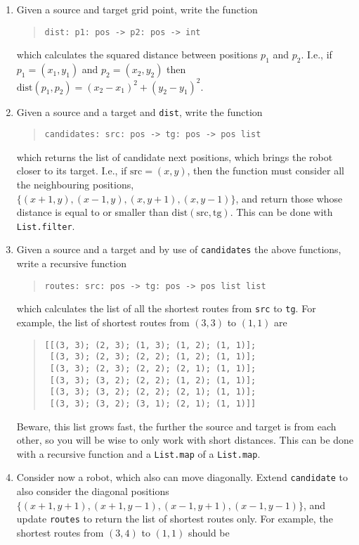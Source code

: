 \begin{enumerate}
\item Given a source and target grid point, write the function
\begin{quote}
  \lstinline{dist: p1: pos -> p2: pos -> int}
\end{quote}
  which calculates the squared distance between positions $p_1$ and $p_2$. I.e., if $p_1 = (x_1,y_1)$ and $p_2 = (x_2,y_2)$ then $\text{dist}(p_1,p_2)=(x_2-x_1)^2+(y_2-y_1)^2$.
\item Given a source and a target and \lstinline{dist}, write the function
\begin{quote}
  \lstinline{candidates: src: pos -> tg: pos -> pos list}
\end{quote}
which returns the list of candidate next positions, which brings the robot closer to its target. I.e., if $\text{src}=(x,y)$, then the function must consider all the neighbouring positions, $\{(x+1,y),(x-1,y),(x,y+1),(x,y-1)\}$, and return those whose distance is equal to or smaller than $\text{dist}(\text{src},\text{tg})$. This can be done with \lstinline{List.filter}.
\item Given a source and a target and by use of \lstinline{candidates} the above functions, write a recursive function
\begin{quote}
  \lstinline{routes: src: pos -> tg: pos -> pos list list}
\end{quote}
which calculates the list of all the shortest routes from \lstinline{src} to \lstinline{tg}. For example, the list of shortest routes from $(3, 3)$ to $(1, 1)$ are
\begin{quote}
  \lstinline{[[(3, 3); (2, 3); (1, 3); (1, 2); (1, 1)];}\\
  \lstinline{ [(3, 3); (2, 3); (2, 2); (1, 2); (1, 1)];}\\
  \lstinline{ [(3, 3); (2, 3); (2, 2); (2, 1); (1, 1)];}\\
  \lstinline{ [(3, 3); (3, 2); (2, 2); (1, 2); (1, 1)];}\\
  \lstinline{ [(3, 3); (3, 2); (2, 2); (2, 1); (1, 1)];}\\
  \lstinline{ [(3, 3); (3, 2); (3, 1); (2, 1); (1, 1)]]}
\end{quote}
Beware, this list grows fast, the further the source and target is from each other, so you will be wise to only work with short distances. This can be done with a recursive function and a \lstinline{List.map} of a \lstinline{List.map}.
\item Consider now a robot, which also can move diagonally. Extend \lstinline{candidate} to also consider the diagonal positions $\{(x+1,y+1),(x+1,y-1),(x-1,y+1),(x-1,y-1)\}$, and update \lstinline{routes} to return the list of shortest routes only. For example, the shortest routes from $(3, 4)$ to $(1, 1)$ should be

\end{enumerate}
